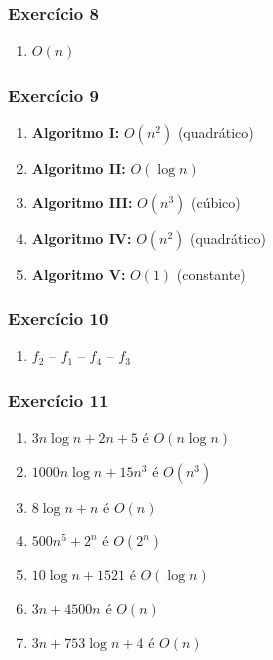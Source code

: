 \documentclass[aspectratio=169]{beamer}
\begin{document}
\begin{frame}[fragile]\frametitle{Exercício 8}
\begin{enumerate}[A]
	\setcounter{enumi}{0}
	\item $O(n)$ %
\end{enumerate}
\end{frame}

\begin{frame}[fragile]\frametitle{Exercício 9}
\begin{enumerate}[a]
	\setcounter{enumi}{0}
	\item \textbf{Algoritmo I:} $O(n^2)$ (quadrático)
	\item \textbf{Algoritmo II:} $O(\log{n})$
	\item \textbf{Algoritmo III:} $O(n^3)$ (cúbico)
	\item \textbf{Algoritmo IV:} $O(n^2)$ (quadrático)
	\item \textbf{Algoritmo V:} $O(1)$ (constante)
\end{enumerate}
\end{frame}

\begin{frame}[fragile]\frametitle{Exercício 10}
\begin{enumerate}[A]
	\setcounter{enumi}{0}
	\item $f_2$ -- $f_1$ -- $f_4$ -- $f_3$ %
\end{enumerate}
\end{frame}

\begin{frame}[fragile]\frametitle{Exercício 11}
\begin{enumerate}[a]
	\setcounter{enumi}{0}
	\item $3n\log{n} + 2n + 5$ é $O(n\log{n})$
	\item $1000n\log{n} + 15n^3$ é $O(n^3)$
	\item $8\log{n} + n$ é $O(n)$
	\item $500n^5 + 2^n$ é $O(2^n)$
	\item $10\log{n} + 1521$ é $O(\log{n})$
	\item $3n + 4500n$ é $O(n)$
	\item $3n + 753\log{n} + 4$ é $O(n)$
\end{enumerate}
\end{frame}

\end{document}

